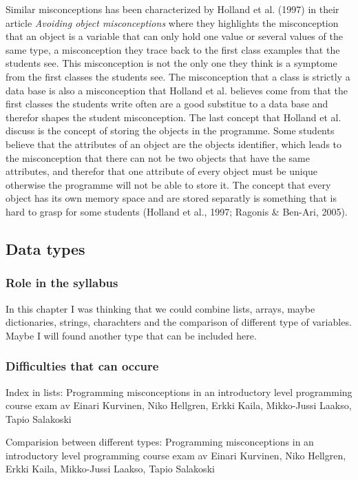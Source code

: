 \documentclass[twocolumn]{article}
\begin{document}
Similar misconceptions has been characterized by Holland et al. (1997) in their article \emph{Avoiding object misconceptions} where they highlights the misconception that an object is a variable that can only hold one value or several values of the same type, a misconception they trace back to the first class examples that the students see. This misconception is not the only one they think is a symptome from the first classes the students see. The misconception that a class is strictly a data base is also a misconception that Holland et al. believes come from that the first classes the students write often are a good substitue to a data base and therefor shapes the student misconception. The last concept that Holland et al. discuss is the concept of storing the objects in the programme. Some students believe that the attributes of an object are the objects identifier, which leads to the misconception that there can not be two objects that have the same attributes, and therefor that one attribute of every object must be unique otherwise the programme will not be able to store it. The concept that every object has its own memory space and are stored separatly is something that is hard to grasp for some students (Holland et al., 1997; Ragonis \& Ben-Ari, 2005). 

\subsection{Data types}

\subsubsection{Role in the syllabus}

In this chapter I was thinking that we could combine lists, arrays, maybe dictionaries, strings, charachters and the comparison of different type of variables. Maybe I will found another type that can be included here. 

\subsubsection{Difficulties that can occure}

Index in lists: Programming misconceptions in an introductory level programming course exam av Einari Kurvinen, Niko Hellgren, Erkki Kaila, Mikko-Jussi Laakso, Tapio Salakoski

Comparision between different types: Programming misconceptions in an introductory level programming course exam av Einari Kurvinen, Niko Hellgren, Erkki Kaila, Mikko-Jussi Laakso, Tapio Salakoski
\end{document}
